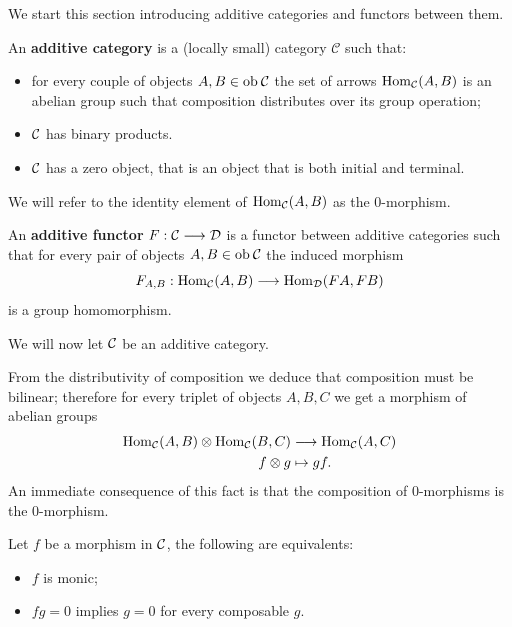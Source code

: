 We start this section introducing additive categories and functors between them.

\begin{definition}
    An \textbf{additive category} is a (locally small) category $\mathcal{C}$ such that:
    \begin{itemize}
        \item for every couple of objects $A,B \in \mathrm{ob} \: \mathcal{C}$ the set of arrows $\mathrm{Hom}_{\mathcal{C}}(A,B)$ is an abelian group such that composition distributes over its group operation;
        \item $\mathcal{C}$ has binary products.
        \item $\mathcal{C}$ has a zero object, that is an object that is both initial and terminal.
    \end{itemize} 
    We will refer to the identity element of $\mathrm{Hom}_{\mathcal{C}}(A,B)$ as the $0$-morphism.
\end{definition}


\begin{definition}
	An \textbf{additive functor} $F: \mathcal{C} \longrightarrow \mathcal{D}$ is a functor between additive categories such that for every pair of objects $A,B \in \mathrm{ob} \: \mathcal{C}$ the induced morphism
	\[F_{A,B}:\mathrm{Hom}_{\mathcal{C}}(A,B) \longrightarrow \mathrm{Hom}_{\mathcal{D}}(FA,FB)\] 
	is a group homomorphism.
\end{definition}


We will now let $\mathcal{C}$ be an additive category.

\begin{remark}
	From the distributivity of composition we deduce that composition must be bilinear; therefore for every triplet of objects $A,B,C$ we get a morphism of abelian groups
	\begin{align}
		\mathrm{Hom}_{\mathcal{C}}(A,B) \otimes \mathrm{Hom}_{\mathcal{C}}(B,C) & \longrightarrow \mathrm{Hom}_{\mathcal{C}}(A, C) \\
		f \otimes g & \mapsto gf.
	\end{align}
	An immediate consequence of this fact is that the composition of $0$-morphisms is the $0$-morphism.
\end{remark}


\begin{proposition}
	\label{prop:mono-equiv}
	Let $f$ be a morphism in $\mathcal{C}$, the following are equivalents:
	\begin{itemize}
		\item $f$ is monic;
		\item $fg = 0$ implies $g=0$ for every composable $g$.
	\end{itemize}
\end{proposition}


